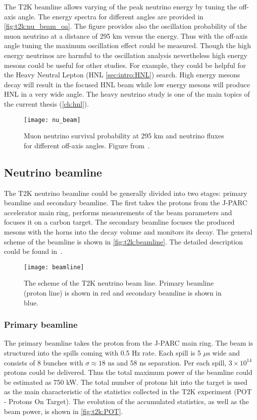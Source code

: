\documentclass[../main.tex]{subfiles}
\begin{document}
The T2K beamline allows varying of the peak neutrino energy by tuning the off-axis angle. The energy spectra for different angles are provided in \autoref{fig:t2k:nu_beam_oa}. The figure provides also the oscillation probability of the muon neutrino at a distance of 295 km versus the energy. Thus with the off-axis angle tuning the maximum oscillation effect could be measured. Though the high energy neutrinos are harmful to the oscillation analysis nevertheless high energy mesons could be useful for other studies. For example, they could be helpful for the Heavy Neutral Lepton (HNL \autoref{sec:intro:HNL}) search. High energy mesons decay will result in the focused HNL beam while low energy mesons will produce HNL in a very wide angle. The heavy neutrino study is one of the main topics of the current thesis (\autoref{ch:hnl}). 

\begin{figure}[!ht]
  \centering
  \texttt{[image: nu\_beam]}
  \caption{Muon neutrino survival probability at 295 km and neutrino fluxes for different off-axis angles. Figure from~\cite{Abe2013}.}
  \label{fig:t2k:nu_beam_oa}
\end{figure}

\subsection{Neutrino beamline}
The T2K neutrino beamline could be generally divided into two stages: primary beamline and secondary beamline. The first takes the protons from the J-PARC accelerator main ring, performs measurements of the beam parameters and focuses it on a carbon target. The secondary beamline focuses the produced mesons with the horns into the decay volume and monitors its decay. The general scheme of the beamline is shown in \autoref{fig:t2k:beamline}. The detailed description could be found in~\cite{Abe2013}.

\begin{figure}[!ht]
  \centering
  \texttt{[image: beamline]}
  \caption{The scheme of the T2K neutrino beam line. Primary beamline (proton line) is shown in red and secondary beamline is shown in blue.}
  \label{fig:t2k:beamline}
\end{figure}

\subsubsection{Primary beamline}
The primary beamline takes the proton from the J-PARC main ring. The beam is structured into the spills coming with 0.5 Hz rate. Each spill is 5 $\mu\text{s}$ wide and consists of 8 bunches with $\sigma\approx18 \text{ ns}$ and 58 ns separation. Per each spill, $3\times10^{14}$ protons could be delivered. Thus the total maximum power of the beamline could be estimated as 750 kW. The total number of protons hit into the target is used as the main characteristic of the statistics collected in the T2K experiment (POT - Protons On Target). The evolution of the accumulated statistics, as well as the beam power, is shown in \autoref{fig:t2k:POT}.
\end{document}
